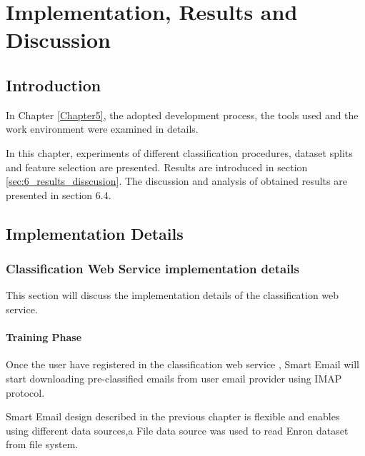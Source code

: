
\chapter{Implementation, Results and Discussion} %

\label{Chapter6} %



\section{Introduction}
In Chapter \ref{Chapter5}, the adopted development process, the tools used and the work environment were examined in details.

In this chapter, experiments of different classification procedures, dataset 
splits and feature selection are presented. Results are introduced in section 
\ref{sec:6_results_disscusion}. The discussion and analysis of obtained results are presented in section 6.4.

\section{Implementation Details}

\subsection{Classification Web Service implementation details}
This section will discuss the implementation details of the classification web service.


    \subsubsection{Training Phase}
    Once the user have registered in the classification web service , Smart Email will start downloading pre-classified emails from
    user email provider using IMAP protocol.

    Smart Email design described in the previous chapter is flexible and enables using different data sources,a File data source was used
    to read Enron \cite{ENRON} dataset from file system.

